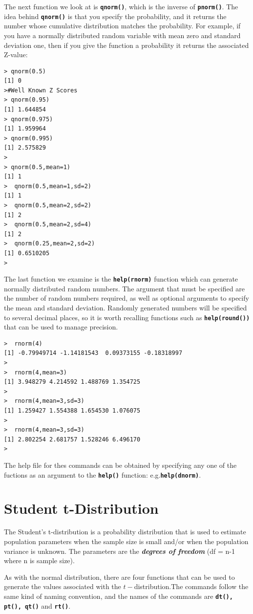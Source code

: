 \documentclass[a4paper,12pt]{article}
\begin{document}
The next function we look at is \texttt{\textbf{qnorm()}}, which is the inverse of \texttt{\textbf{pnorm()}}. The idea behind \texttt{\textbf{qnorm()}} is that you specify the probability, and it returns the number whose cumulative distribution matches the probability. 
For example, if you have a normally distributed random variable with mean zero and standard deviation one, then if you give the function a probability it returns the associated Z-value:


\begin{verbatim}
> qnorm(0.5)
[1] 0
>#Well Known Z Scores
> qnorm(0.95)
[1] 1.644854
> qnorm(0.975)
[1] 1.959964
> qnorm(0.995)
[1] 2.575829
>
> qnorm(0.5,mean=1)
[1] 1
>  qnorm(0.5,mean=1,sd=2)
[1] 1
>  qnorm(0.5,mean=2,sd=2)
[1] 2
>  qnorm(0.5,mean=2,sd=4)
[1] 2
>  qnorm(0.25,mean=2,sd=2)
[1] 0.6510205
> 
\end{verbatim}

The last function we examine is the  \textbf{\texttt{help(rnorm)}} function which can generate normally distributed random numbers. The argument that must be specified are the number of random numbers required, as well as optional arguments to specify the mean and standard deviation. Randomly generated numbers will be specified to several decimal places, so it is worth recalling functions such as \textbf{\texttt{help(round())}} that can be used to manage precision.
\begin{verbatim}
>  rnorm(4)
[1] -0.79949714 -1.14181543  0.09373155 -0.18318997
>
>  rnorm(4,mean=3)
[1] 3.948279 4.214592 1.488769 1.354725
>
>  rnorm(4,mean=3,sd=3)
[1] 1.259427 1.554388 1.654530 1.076075
> 
>  rnorm(4,mean=3,sd=3)
[1] 2.802254 2.681757 1.528246 6.496170
> 
\end{verbatim}

The help file for thes commands can be obtained by specifying any one of the fuctions as an argument to the \textbf{\texttt{help()}} function: e.g.\textbf{\texttt{help(dnorm)}}.

\section{Student t-Distribution}
The Student’s t-distribution is a probability distribution that is used to estimate population parameters when the sample size is small and/or when the population variance is unknown.
The parameters are the \textbf{\textit{degrees of freedom}} (df = n-1 where n is sample size).

As with the normal distribution, there are four functions that can be used to generate the values associated with the $t-$distribution.The commands follow the same kind of naming convention, and the names of the commands are \texttt{\textbf{dt(), pt(), qt()}} and \texttt{\textbf{rt()}}.
\end{document}

